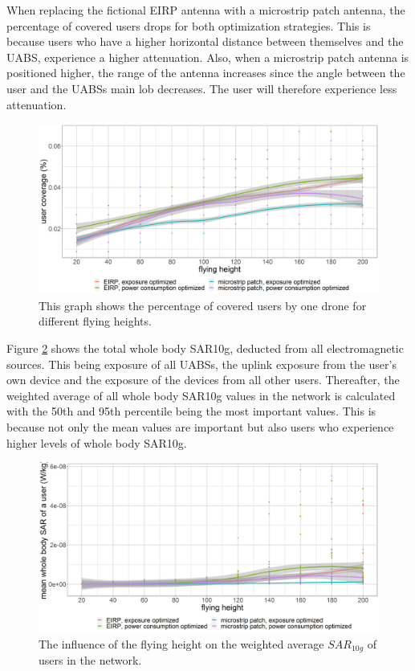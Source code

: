 When replacing the fictional \gls{EIRP} antenna with a microstrip patch antenna, the percentage of covered users drops for both 
optimization strategies. This is because users who have a higher horizontal distance between themselves and the \gls{UABS}, 
experience a higher attenuation. Also, when a microstrip patch antenna is positioned higher, the range of the antenna increases 
since the angle between the user and the \gls{UABS}s main lob decreases. The user will therefore experience less attenuation.


\begin{figure}[h!]
  \includegraphics[width=\textwidth]{../results/s2/fhvscov.png}
  \caption{This graph shows the percentage of covered users by one drone for different flying heights.}
  \label{fig:s2fhvscov}
\end{figure}

Figure \ref{fig:s2fhvssar} shows the total whole body SAR10g, deducted from all electromagnetic sources. This being exposure of all \gls{UABS}s,
 the uplink exposure from the user’s own device and the exposure of the devices from all other users. 
 Thereafter, the weighted average of all whole body SAR10g values in the network is calculated with the 50th and 95th percentile 
 being the most important values. This is because not only the mean values are important but also users who experience higher 
 levels of whole body SAR10g.


\begin{figure}[h!]
  \includegraphics[width=\textwidth]{../results/s2/fhvssar.png}
  \caption{The influence of the flying height on the weighted average $SAR_{10g}$ of users in the network.}
  \label{fig:s2fhvssar}
\end{figure}

